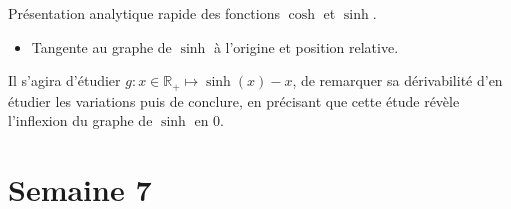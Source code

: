 \documentclass{article}
\renewenvironment{question_kholle}[2][ ]
{
	\subsection{\texorpdfstring{#2}{}}
	\notblank{#1}
	{
		\noindent #1
		\bigbreak
	}
	{}
	\begin{proof}
}
{
	\end{proof}
}
\begin{document}
\begin{question_kholle}{Présentation analytique rapide des fonctions \(\cosh\) et \(\sinh \).}
\begin{itemize}[label=$\bullet$]
		      \[
			      \frac{\cosh(x)}{x} = \underset{\xrightarrow[x\to +\infty]{} \ +\infty}{\underbrace{\frac{e^{x}}{x}}} + \underset{\xrightarrow[x\to +\infty]{} \ 0}{\underbrace{\frac{e^{-x}}{x}}} \xrightarrow[x\to +\infty]{} \ +\infty
		      \]
		      Donc le graphe de $\cosh$ admet une branche parabolique de direction asymptotique $\left( O, \overrightarrow{\jmath}\right)$.
		      \newline
		      On a :
		      \[
			      \forall x \in \mathbb{R}, \quad \cosh(x) - \sinh(x) = e^{-x} \xrightarrow[x\to +\infty]{} 0^+
		      \]
		      Donc les graphes des deux fonctions se rapprochent l'un de l'autre arbitrairement près lorsque $x \to +\infty$, et le graphe de $\cosh$ est au-dessus de celui de $\sinh$.

		      \

		\item Tangente au graphe de $\sinh$ à l'origine et position relative.
	\end{itemize}

	Il s'agira d'étudier $g : x\in \mathbb{R}_+ \mapsto \sinh(x) -x$, de remarquer sa dérivabilité d'en étudier les variations puis de conclure, en précisant que cette étude révèle l'inflexion du graphe de $\sinh$ en 0.
\end{question_kholle}

\pagebreak\section{Semaine 7}
\end{document}
